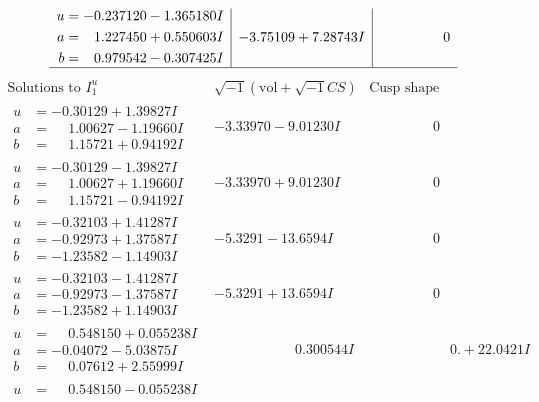\documentclass[1p]{elsarticle_modified}
\theoremstyle{definition}
\newcommand{\I}{\sqrt{-1}}
\begin{document}
$$\begin{array}{c|c|c}
\begin{aligned}
u &= -0.237120 - 1.365180 I \\
a &= \phantom{-}1.227450 + 0.550603 I \\
b &= \phantom{-}0.979542 - 0.307425 I\end{aligned}
 & -3.75109 + 7.28743 I & \phantom{-0.000000 } 0\\
 \hline 
 \end{array}$$\newpage$$\begin{array}{c|c|c}  
\text{Solutions to }I^u_{1}& \I (\text{vol} + \sqrt{-1}CS) & \text{Cusp shape}\\
 \hline 
\begin{aligned}
u &= -0.30129 + 1.39827 I \\
a &= \phantom{-}1.00627 - 1.19660 I \\
b &= \phantom{-}1.15721 + 0.94192 I\end{aligned}
 & -3.33970 - 9.01230 I & \phantom{-0.000000 } 0 \\ \hline\begin{aligned}
u &= -0.30129 - 1.39827 I \\
a &= \phantom{-}1.00627 + 1.19660 I \\
b &= \phantom{-}1.15721 - 0.94192 I\end{aligned}
 & -3.33970 + 9.01230 I & \phantom{-0.000000 } 0 \\ \hline\begin{aligned}
u &= -0.32103 + 1.41287 I \\
a &= -0.92973 + 1.37587 I \\
b &= -1.23582 - 1.14903 I\end{aligned}
 & -5.3291 - 13.6594 I & \phantom{-0.000000 } 0 \\ \hline\begin{aligned}
u &= -0.32103 - 1.41287 I \\
a &= -0.92973 - 1.37587 I \\
b &= -1.23582 + 1.14903 I\end{aligned}
 & -5.3291 + 13.6594 I & \phantom{-0.000000 } 0 \\ \hline\begin{aligned}
u &= \phantom{-}0.548150 + 0.055238 I \\
a &= -0.04072 - 5.03875 I \\
b &= \phantom{-}0.07612 + 2.55999 I\end{aligned}
 & \phantom{-0.000000 -}0.300544 I & \phantom{-0.000000 -}0. + 22.0421 I \\ \hline\begin{aligned}
u &= \phantom{-}0.548150 - 0.055238 I \\

\end{aligned}
\end{array}$$
\end{document}
